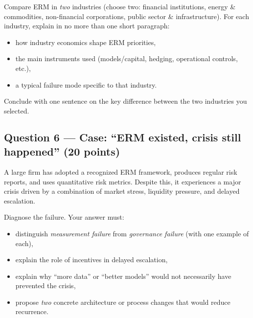 \documentclass[11pt,a4paper]{article}
\begin{document}
Compare ERM in \emph{two} industries (choose two: financial institutions, energy \& commodities,
non-financial corporations, public sector \& infrastructure).
For each industry, explain in no more than one short paragraph:
\begin{itemize}
  \item[$\bullet$] how industry economics shape ERM priorities,
  \item[$\bullet$] the main instruments used (models/capital, hedging, operational controls, etc.),
  \item[$\bullet$] a typical failure mode specific to that industry.
\end{itemize}
Conclude with one sentence on the key difference between the two industries you selected.

\subsection*{Question 6 --- Case: ``ERM existed, crisis still happened'' \hfill (20 points)}

A large firm has adopted a recognized ERM framework, produces regular risk reports, and uses
quantitative risk metrics. Despite this, it experiences a major crisis driven by a combination
of market stress, liquidity pressure, and delayed escalation.

Diagnose the failure. Your answer must:
\begin{itemize}
  \item[$\bullet$] distinguish \emph{measurement failure} from \emph{governance failure} (with one example of each),
  \item[$\bullet$] explain the role of incentives in delayed escalation,
  \item[$\bullet$] explain why ``more data'' or ``better models'' would not necessarily have prevented the crisis,
  \item[$\bullet$] propose \emph{two} concrete architecture or process changes that would reduce recurrence.
\end{itemize}
\end{document}
